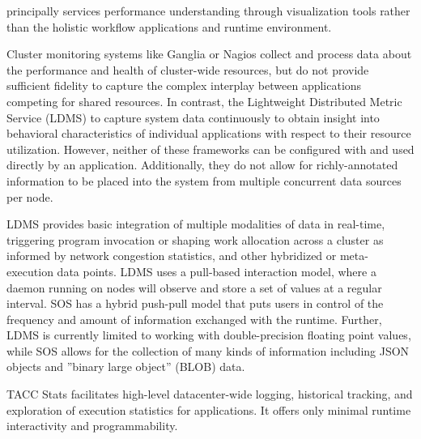 principally services performance understanding through visualization
tools rather than the holistic workflow applications and runtime
environment.
%
\par
%
Cluster monitoring systems like Ganglia \cite{massie2004ganglia} or
Nagios \cite{katsaros2011building} collect and process data about the
performance and health of cluster-wide resources, but do not provide
sufficient fidelity to capture the complex interplay between
applications competing for shared resources.
%
In contrast, the Lightweight Distributed Metric Service
\cite{agelastos2014lightweight} (LDMS) to capture system data
continuously to obtain insight into behavioral characteristics of
individual applications with respect to their resource utilization.
%
%
However, neither of these frameworks can be configured with and used
directly by an application.
%
Additionally, they do not allow for richly-annotated information to be
placed into the system from multiple concurrent data sources per node.
%
\par
%
LDMS provides basic integration of multiple modalities of data in
real-time, triggering program invocation or shaping work allocation
across a cluster as informed by network congestion statistics, and
other hybridized or meta-execution data points.
%
LDMS uses a pull-based interaction model, where a daemon running on
nodes will observe and store a set of values at a regular interval.
%
SOS has a hybrid push-pull model that puts users in control of the
frequency and amount of information exchanged with the runtime.
%
Further, LDMS is currently limited to working with double-precision
floating point values, while SOS allows for the collection of many
kinds of information including JSON objects and ''binary large
object'' (BLOB) data.
%
\par
%
TACC Stats \cite{evans2014comprehensive} facilitates high-level
datacenter-wide logging, historical tracking, and exploration of
execution statistics for applications.  It offers only minimal
runtime interactivity and programmability.
%



